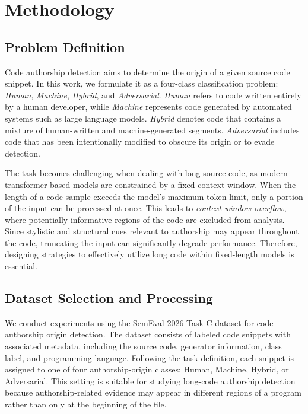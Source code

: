 \documentclass[conference]{IEEEtran}
\begin{document}
\section{Methodology}

\subsection{Problem Definition}

Code authorship detection aims to determine the origin of a given source code snippet. In this work, we formulate it as a four-class classification problem: \textit{Human}, \textit{Machine}, \textit{Hybrid}, and \textit{Adversarial}. \textit{Human} refers to code written entirely by a human developer, while \textit{Machine} represents code generated by automated systems such as large language models. \textit{Hybrid} denotes code that contains a mixture of human-written and machine-generated segments. \textit{Adversarial} includes code that has been intentionally modified to obscure its origin or to evade detection.

The task becomes challenging when dealing with long source code, as modern transformer-based models are constrained by a fixed context window. When the length of a code sample exceeds the model's maximum token limit, only a portion of the input can be processed at once. This leads to \textit{context window overflow}, where potentially informative regions of the code are excluded from analysis. Since stylistic and structural cues relevant to authorship may appear throughout the code, truncating the input can significantly degrade performance. Therefore, designing strategies to effectively utilize long code within fixed-length models is essential.

\subsection{Dataset Selection and Processing}

We conduct experiments using the SemEval-2026 Task C dataset \cite{orel-etal-2025-codet} for code authorship origin detection. The dataset consists of labeled code snippets with associated metadata, including the source code, generator information, class label, and programming language. Following the task definition, each snippet is assigned to one of four authorship-origin classes: Human, Machine, Hybrid, or Adversarial. This setting is suitable for studying long-code authorship detection because authorship-related evidence may appear in different regions of a program rather than only at the beginning of the file.
\end{document}

